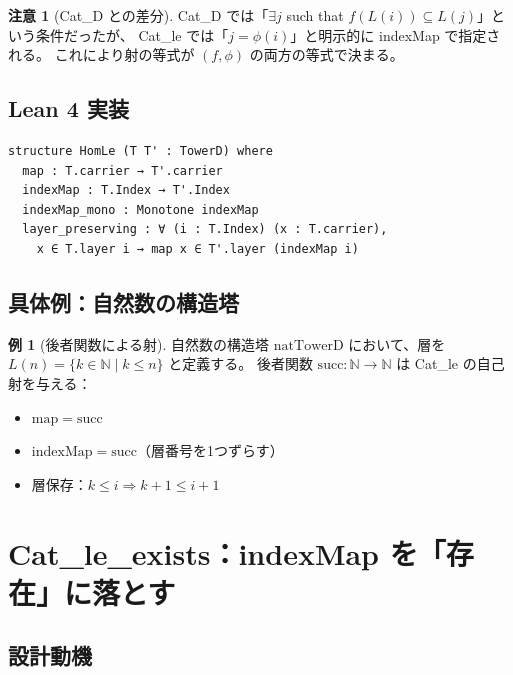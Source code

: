 \documentclass{ltjsarticle}
\theoremstyle{definition}
\newtheorem{example}[definition]{例}
\newtheorem{remark}[definition]{注意}
\begin{document}
\begin{remark}[Cat\_D との差分]
Cat\_D では「$\exists j$ such that $f(L(i)) \subseteq L(j)$」という条件だったが、
Cat\_le では「$j = \phi(i)$」と明示的に indexMap で指定される。
これにより射の等式が $(f, \phi)$ の両方の等式で決まる。
\end{remark}

\subsection{Lean 4 実装}

\begin{leanbox}
\begin{lstlisting}
structure HomLe (T T' : TowerD) where
  map : T.carrier → T'.carrier
  indexMap : T.Index → T'.Index
  indexMap_mono : Monotone indexMap
  layer_preserving : ∀ (i : T.Index) (x : T.carrier),
    x ∈ T.layer i → map x ∈ T'.layer (indexMap i)
\end{lstlisting}
\end{leanbox}

\subsection{具体例：自然数の構造塔}

\begin{example}[後者関数による射]
自然数の構造塔 $\mathrm{natTowerD}$ において、層を $L(n) = \{k \in \mathbb{N} \mid k \leq n\}$ と定義する。
後者関数 $\mathrm{succ}: \mathbb{N} \to \mathbb{N}$ は Cat\_le の自己射を与える：
\begin{itemize}
  \item $\mathrm{map} = \mathrm{succ}$
  \item $\mathrm{indexMap} = \mathrm{succ}$（層番号を1つずらす）
  \item 層保存：$k \leq i \Rightarrow k+1 \leq i+1$
\end{itemize}
\end{example}

\section{Cat\_le\_exists：indexMap を「存在」に落とす}
\label{sec:cat-le-exists}

\subsection{設計動機}
\end{document}
